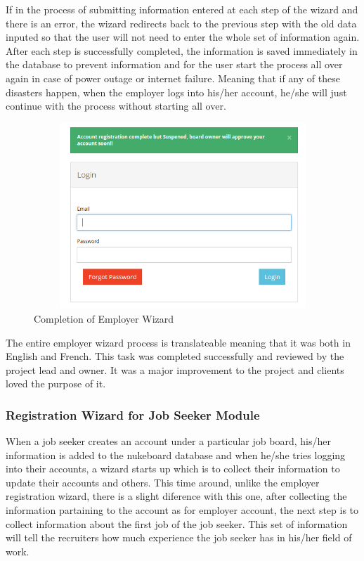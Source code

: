 If in the process of submitting information entered at each step of the wizard and there is an error, the wizard redirects back to the previous step with the old data inputed so that the user will not need to enter the whole set of information again. After each step is successfully completed, the information is saved immediately in the database to prevent information and for the user start the process all over again in case of power outage or internet failure. Meaning that if any of these disasters happen, when the employer logs into his/her account, he/she will just continue with the process without starting all over.

\begin{figure}[h]
\centering
\includegraphics[width=13cm,height=7cm,keepaspectratio]{Figures/EmployerWizardComplete}
\decoRule
\caption[Employer Wizard Complete]{Completion of Employer Wizard}
\label{fig:EmployerWizardComplete}
\end{figure}

The entire employer wizard process is translateable meaning that it was both in English and French. This task was completed successfully and reviewed by the project lead and owner. It was a major improvement to the project and clients loved the purpose of it.


\subsubsection{Registration Wizard for Job Seeker Module}

When a job seeker creates an account under a particular job board, his/her information is added to the nukeboard database and when he/she tries logging into their accounts, a wizard starts up which is to collect their information to update their accounts and others. This time around, unlike the employer registration wizard, there is a slight diference with this one, after collecting the information partaining to the account as for employer account, the next step is to collect information about the first job of the job seeker. This set of information will tell the recruiters how much experience the job seeker has in his/her field of work.

